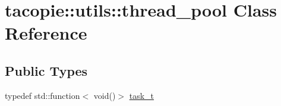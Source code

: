 \hypertarget{classtacopie_1_1utils_1_1thread__pool}{}\section{tacopie\+:\+:utils\+:\+:thread\+\_\+pool Class Reference}
\label{classtacopie_1_1utils_1_1thread__pool}
\subsection*{Public Types}
\begin{DoxyCompactItemize}
\item 
typedef std\+::function$<$ void()$>$ \hyperlink{classtacopie_1_1utils_1_1thread__pool_a8ae8886fdeaa8e5c0abad12626a47296}{task\+\_\+t}
\end{DoxyCompactItemize}
